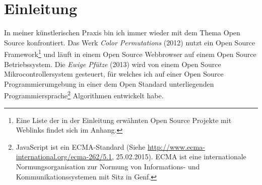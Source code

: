 \documentclass[
paper=164mm:234mm, %
pagesize, %
DIV=calc, %
10pt, %
parskip=half- %
]{scrbook}
\begin{document}
\extratitle{\null \vfill
\texttt{[image: cc\_by\_sa]} \\
\footnotesize{\emph{Copying is an Act of Love. Open Source in den Digitalen Künsten} von Jonas Probst steht unter der Creative Commons Attribution-ShareAlike 4.0 International Lizenz. Die Weiterverwendung ist nur unter gleichen Bedingungen und mit Namensnennung möglich. Eine Kopie der Lizenz befindet sich unter \url{http://creativecommons.org/licenses/by-sa/4.0/}.\\

Diese Arbeit wurde in LaTeX verfasst, einer auf dem Open Source Textsatzsystem TeX beruhenden Auszeichnungssprache. Der Quellcode befindet sich unter \\
\url{http://github.com/jonasprobst/copying-is-an-act-of-love}.}
}






\date{\today}
\publishers{Hochschule der Künste Bern \\ MA Contemporary Arts Practice}
\lowertitleback{\normalsize{
Herzlichen Dank an\\
Andi Schoon, Rikka Feuz, Roger Villars, Micha Haarenberg und Hansjürg Wenger}}
\maketitle %

\newpage
\thispagestyle{empty}
\tableofcontents

{}
\chapter*{Einleitung}
In meiner künstlerischen Praxis bin ich immer wieder mit dem Thema Open Source konfrontiert. Das Werk \emph{Color Permutations} (2012) nutzt ein Open Source Framework\footnote{Eine Liste der in der Einleitung erwähnten Open Source Projekte mit Weblinks findet sich im Anhang.} und läuft in einem Open Source Webbrowser auf einem Open Source Betriebssystem. Die \emph{Ewige Pfütze} (2013) wird von einem Open Source Mikrocontrollersystem gesteuert, für welches ich auf einer Open Source Programmierumgebung in einer dem Open Standard unterliegenden Programmiersprache\footnote{JavaScript ist ein ECMA-Standard (Siehe \url{http://www.ecma-international.org/ecma-262/5.1}, 25.02.2015). ECMA ist eine internationale Normungsorganisation zur Normung von Informations- und Kommunikationssystemen mit Sitz in Genf.} Algorithmen entwickelt habe.
\end{document}
